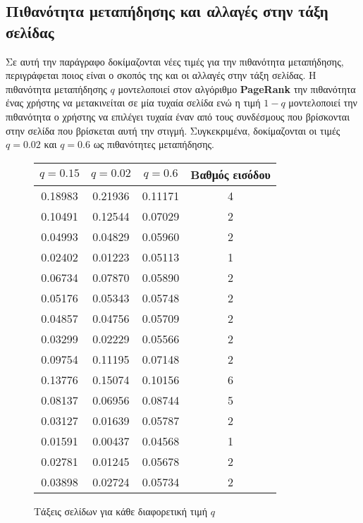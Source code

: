\documentclass[First Project.tex]{subfiles}
\begin{document}
\subsection{ Πιθανότητα μεταπήδησης και αλλαγές στην τάξη σελίδας }

Σε αυτή την παράγραφο δοκίμαζονται νέες τιμές για την πιθανότητα μεταπήδησης, περιγράφεται ποιος είναι ο σκοπός της και οι αλλαγές στην τάξη
σελίδας. Η πιθανότητα μεταπήδησης $q$ μοντελοποιεί στον αλγόριθμο \textlatin{\textbf{PageRank}} την πιθανότητα ένας χρήστης να μετακινείται σε 
μία τυχαία σελίδα ενώ η τιμή $1-q$ μοντελοποιεί την πιθανότητα ο χρήστης να επιλέγει τυχαία έναν από τους συνδέσμους που βρίσκονται στην σελίδα
που βρίσκεται αυτή την στιγμή. Συγκεκριμένα, δοκίμαζονται οι τιμές $q=0.02$ και $q=0.6$ ως πιθανότητες μεταπήδησης.

\begin{figure}[h!]
    \centering
    \captionsetup{justification=centering}
    \begin{center}
        \begin{tabular}{ |c|c|c|c| }       
            \hline
            \textbf{\textlatin{$q=0.15$}} & \textbf{\textlatin{$q=0.02$}} & \textbf{\textlatin{$q=0.6$}} & Βαθμός εισόδου \\
            \hline 
            0.18983 & 0.21936 & 0.11171 & 4 \\
            0.10491 & 0.12544 & 0.07029 & 2 \\ 
            0.04993 & 0.04829 & 0.05960 & 2 \\
            0.02402 & 0.01223 & 0.05113 & 1 \\
            0.06734 & 0.07870 & 0.05890 & 2 \\
            0.05176 & 0.05343 & 0.05748 & 2 \\
            0.04857 & 0.04756 & 0.05709 & 2 \\
            0.03299 & 0.02229 & 0.05566 & 2 \\
            0.09754 & 0.11195 & 0.07148 & 2 \\
            0.13776 & 0.15074 & 0.10156 & 6 \\
            0.08137 & 0.06956 & 0.08744 & 5 \\
            0.03127 & 0.01639 & 0.05787 & 2 \\
            0.01591 & 0.00437 & 0.04568 & 1 \\
            0.02781 & 0.01245 & 0.05678 & 2 \\
            0.03898 & 0.02724 & 0.05734 & 2 \\
            \hline
        \end{tabular}
        \caption{ Τάξεις σελίδων για κάθε διαφορετική τιμή $q$ }
    \end{center}
\end{figure}
\end{document}
